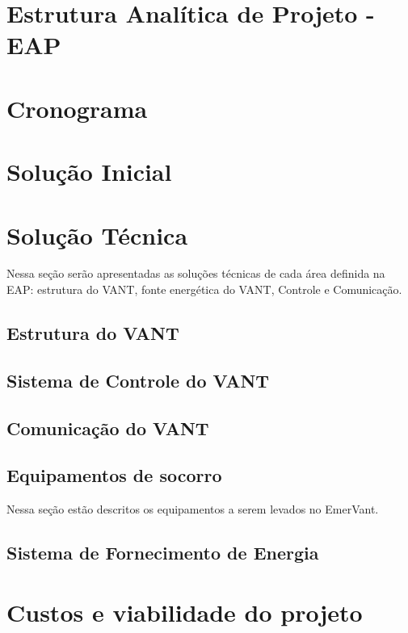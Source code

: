 \section{Estrutura Analítica de Projeto - EAP}
  
 
\pagebreak
\section{Cronograma}
  

\section{Solução Inicial}
  

\section{Solução Técnica}
  Nessa seção serão apresentadas as soluções técnicas de cada área definida na EAP: estrutura do VANT,
  fonte energética do VANT, Controle e Comunicação.

\subsection{Estrutura do VANT}
  
  
\subsection{Sistema de Controle do VANT}
  

\subsection{Comunicação do VANT}
  

\subsection{Equipamentos de socorro}
  Nessa seção estão descritos os equipamentos a serem levados no EmerVant.
  
 
\subsection{Sistema de Fornecimento de Energia}
  
\section{Custos e viabilidade do projeto}
  



